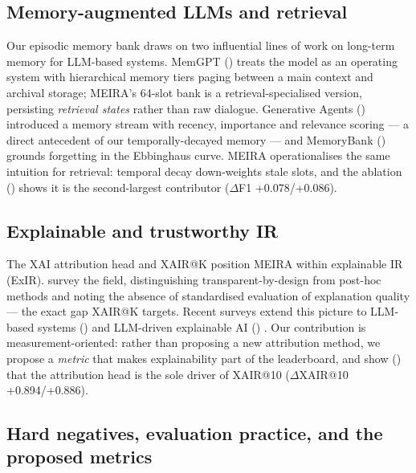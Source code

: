 \subsection{Memory-augmented LLMs and retrieval}
\label{sec:rw-memory}

Our episodic memory bank draws on two influential lines of work on long-term memory for LLM-based systems. MemGPT (\citep{packer2023memgpt})  treats the model as an operating system with hierarchical memory tiers paging between a main context and archival storage; MEIRA's 64-slot bank is a retrieval-specialised version, persisting \emph{retrieval states} rather than raw dialogue. Generative Agents (\citep{park2023generative})  introduced a memory stream with recency, importance and relevance scoring --- a direct antecedent of our temporally-decayed memory --- and MemoryBank (\citep{zhong2024memorybank})  grounds forgetting in the Ebbinghaus curve. MEIRA operationalises the same intuition for retrieval: temporal decay down-weights stale slots, and the ablation () shows it is the second-largest contributor ($\Delta$F1 +0.078/+0.086).

\subsection{Explainable and trustworthy IR}
\label{sec:rw-xai}

The XAI attribution head and XAIR@K position MEIRA within explainable IR (ExIR). \citet{anand2022explainable}  survey the field, distinguishing transparent-by-design from post-hoc methods and noting the absence of standardised evaluation of explanation quality --- the exact gap XAIR@K targets. Recent surveys extend this picture to LLM-based systems (\citep{zhao2024explainability})  and LLM-driven explainable AI (\citep{bilal2025llms}) . Our contribution is measurement-oriented: rather than proposing a new attribution method, we propose a \emph{metric} that makes explainability part of the leaderboard, and show () that the attribution head is the sole driver of XAIR@10 ($\Delta$XAIR@10 +0.894/+0.886).

\subsection{Hard negatives, evaluation practice, and the proposed metrics}
\label{sec:rw-hardneg}

